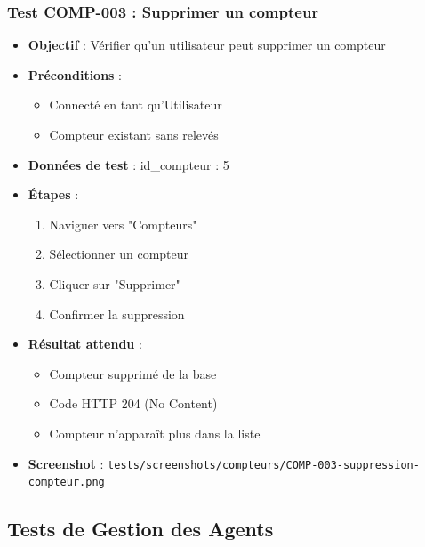 \subsubsection{Test COMP-003 : Supprimer un compteur}
\begin{itemize}
    \item \textbf{Objectif} : Vérifier qu'un utilisateur peut supprimer un compteur
    \item \textbf{Préconditions} : 
        \begin{itemize}
            \item Connecté en tant qu'Utilisateur
            \item Compteur existant sans relevés
        \end{itemize}
    \item \textbf{Données de test} : id\_compteur : 5
    \item \textbf{Étapes} :
        \begin{enumerate}
            \item Naviguer vers "Compteurs"
            \item Sélectionner un compteur
            \item Cliquer sur "Supprimer"
            \item Confirmer la suppression
        \end{enumerate}
    \item \textbf{Résultat attendu} : 
        \begin{itemize}
            \item Compteur supprimé de la base
            \item Code HTTP 204 (No Content)
            \item Compteur n'apparaît plus dans la liste
        \end{itemize}
    \item \textbf{Screenshot} : \texttt{tests/screenshots/compteurs/COMP-003-suppression-compteur.png}
\end{itemize}

\subsection{Tests de Gestion des Agents}

